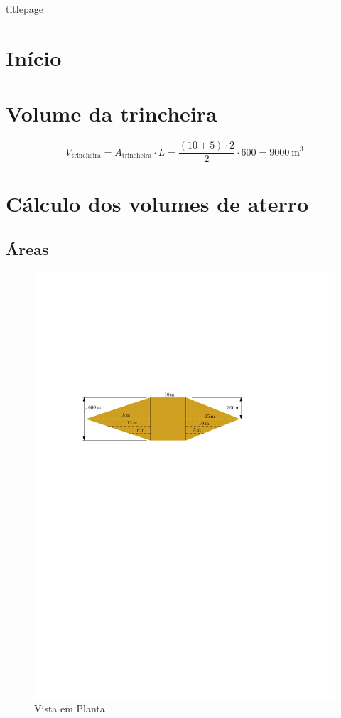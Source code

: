 \documentclass[a4paper, 12pt, brazilian]{article}
\begin{document}
	{titlepage}
	
	\tableofcontents
	
	\newpage
	
	\section{Início}
	
	\section{Volume da trincheira}
	
	\begin{equation}
		V_{\textrm{trincheira}}=A_{\textrm{trincheira}}\cdot L=\dfrac{(10+5)\cdot 2}{2}\cdot 600=\SI{9000}{\meter^{3}}
	\end{equation}
	
	\section{Cálculo dos volumes de aterro}
	
	\subsection{Áreas}
	
	\begin{figure}[H]
		\centering
		\includegraphics[width=0.9\linewidth]{images/planta}
		\caption{Vista em Planta}
		\label{fig:planta}
	\end{figure}
	
\end{document}
